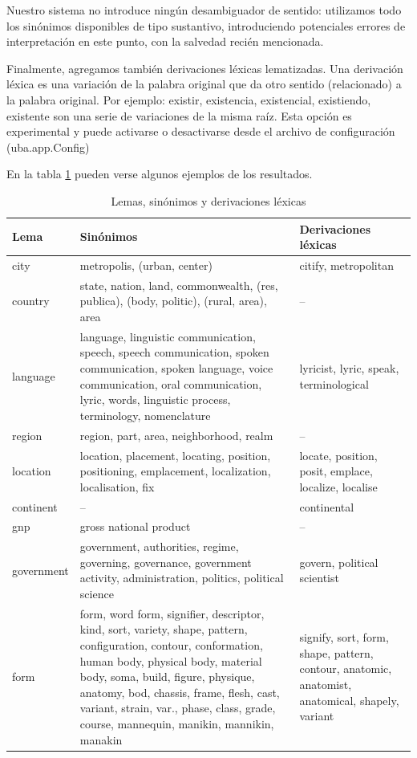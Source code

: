 Nuestro sistema no introduce ningún desambiguador de sentido: utilizamos todo los sinónimos disponibles de tipo sustantivo, introduciendo potenciales errores de interpretación en este punto, con la salvedad recién mencionada.


Finalmente, agregamos también derivaciones léxicas lematizadas. Una derivación léxica es una variación de la palabra original que da otro sentido (relacionado) a la palabra original. Por ejemplo: existir, existencia, existencial, existiendo, existente son una serie de variaciones de la misma raíz.  Esta opción es experimental y puede activarse o desactivarse desde el archivo de configuración (uba.app.Config)

En la tabla \ref{table:sinonimos} pueden verse algunos ejemplos de los resultados.

\begin{center}
\begin{table}[h]
\centering
\begin{tabular}{| l |  p{9.5cm} | p{4cm} |} \hline
Lema & Sinónimos & Derivaciones léxicas\\ \hline
city 	&	metropolis, (urban, center)	&	citify, metropolitan\\ \hline
country	&	state, nation, land, commonwealth, (res, publica), (body, politic), (rural, area), area	&	--\\ \hline
language	&	language, linguistic communication, speech, speech communication, spoken communication, spoken language, voice communication, oral communication, lyric, words, linguistic process, terminology, nomenclature & lyricist, lyric, speak, terminological \\ \hline
region	&	region, part, area, neighborhood, realm	&	--\\ \hline
location	&	location, placement, locating, position, positioning, emplacement, localization, localisation, fix	&	locate, position, posit, emplace, localize, localise\\ \hline
continent	&	--	&	continental\\ \hline
gnp	&	gross national product	&	--\\ \hline
government	&	government, authorities, regime, governing, governance, government activity, administration, politics, political science	&	govern, political scientist\\ \hline
form	&	form, word form, signifier, descriptor, kind, sort, variety, shape, pattern, configuration, contour, conformation, human body, physical body, material body, soma, build, figure, physique, anatomy, bod, chassis, frame, flesh, cast, variant, strain, var., phase, class, grade, course, mannequin, manikin, mannikin, manakin	&	signify, sort, form, shape, pattern, contour, anatomic, anatomist, anatomical, shapely, variant\\ \hline
\end{tabular}
\caption{Lemas, sinónimos y derivaciones léxicas}
\label{table:sinonimos}
\end{table}
\end{center}

